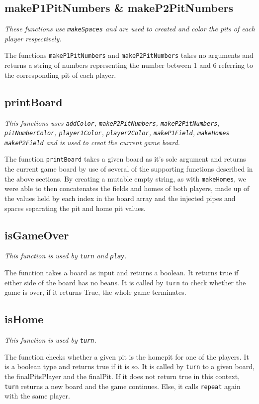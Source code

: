 \documentclass[a4paper]{report}
\begin{document}
\subsection*{makeP1PitNumbers \& makeP2PitNumbers}
{\it These functions use \texttt{makeSpaces} and are used to created and color the pits of each player respectively.}


The functions \texttt{makeP1PitNumbers} and \texttt{makeP2PitNumbers} takes no arguments and returns a string of numbers representing the number between 1 and 6 referring to the corresponding pit of each player.

\subsection*{printBoard}
{\it This functions uses \texttt{addColor}, \texttt{makeP2PitNumbers}, \texttt{makeP2PitNumbers}, \texttt{pitNumberColor}, \texttt{player1Color}, \texttt{player2Color}, \texttt{makeP1Field}, \texttt{makeHomes} \texttt{makeP2Field} and is used to creat the current game board.}

The function \texttt{printBoard} takes a given board as it's sole argument and returns the current game board by use of several of the supporting functions described in the above sections. By creating a mutable empty string, as with \texttt{makeHomes}, we were able to then concatenates the fields and homes of both players, made up of the values held by each index in the board array and the injected pipes and spaces separating the pit and home pit values.

\subsection*{isGameOver}
{\it This function is used by \texttt{turn} and \texttt{play}.}

The function takes a board as input and returns a boolean. It returns true if either side of the board has no beans. It is called by \texttt{turn} to check whether the game is over, if it returns True, the whole game terminates.

\subsection*{isHome}
{\it This function is used by \texttt{turn}.}

The function checks whether a given pit is the homepit for one of the players. It is a boolean type and returns true if it is so.
It is called by \texttt{turn} to a given board, the finalPitsPlayer and the finalPit. If it does not return true in this context, \texttt{turn} returns a new board and the game continues. Else, it calls \texttt{repeat} again with the same player.
\end{document}
